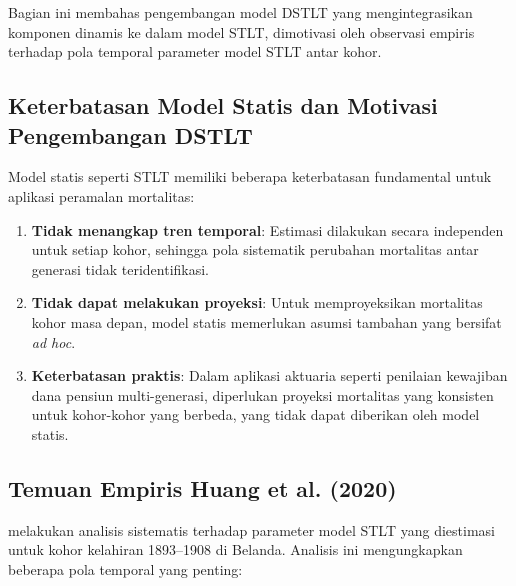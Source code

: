 Bagian ini membahas pengembangan model DSTLT yang mengintegrasikan komponen dinamis ke dalam model STLT, dimotivasi oleh observasi empiris terhadap pola temporal parameter model STLT antar kohor.

\subsection{Keterbatasan Model Statis dan Motivasi Pengembangan DSTLT}

Model statis seperti STLT memiliki beberapa keterbatasan fundamental untuk aplikasi peramalan mortalitas:

\begin{enumerate}
    \item \textbf{Tidak menangkap tren temporal}: Estimasi dilakukan secara independen untuk setiap kohor, sehingga pola sistematik perubahan mortalitas antar generasi tidak teridentifikasi.

    \item \textbf{Tidak dapat melakukan proyeksi}: Untuk memproyeksikan mortalitas kohor masa depan, model statis memerlukan asumsi tambahan yang bersifat \textit{ad hoc}.

    \item \textbf{Keterbatasan praktis}: Dalam aplikasi aktuaria seperti penilaian kewajiban dana pensiun multi-generasi, diperlukan proyeksi mortalitas yang konsisten untuk kohor-kohor yang berbeda, yang tidak dapat diberikan oleh model statis.
\end{enumerate}

\subsection{Temuan Empiris Huang et al. (2020)}

\citet{huang2020modelling} melakukan analisis sistematis terhadap parameter model STLT yang diestimasi untuk kohor kelahiran 1893--1908 di Belanda. Analisis ini mengungkapkan beberapa pola temporal yang penting:

